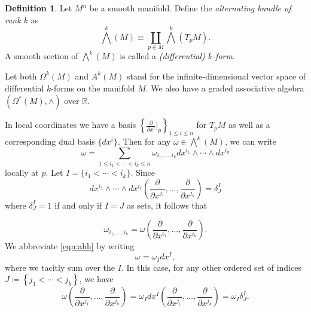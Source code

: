 \documentclass[10pt,letterpaper,cm]{nupset}
\theoremstyle{definition}
\newtheorem{definition}{Definition}[subsection]
\theoremstyle{theorem}
\theoremstyle{remark}
\newcommand{\R}{\mathbb R}
\newcommand{\1}{\mathbf{1}}
\newcommand{\0}{\vec 0}
\begin{document}
\begin{definition}
Let $M^n$ be a smooth manifold. Define the \textit{alternating bundle of rank $k$} as $$\bigwedge^k(M) \equiv \coprod_{p\in M} \bigwedge^k(T_pM).  $$ 
A smooth section of $\bigwedge^k(M)$ is called a \textit{(differential) $k$-form}.
\end{definition}

Let both $\Omega^k(M)$ and $A^k(M)$ stand for the infinite-dimensional vector space of differential $k$-forms on the manifold $M$. We also have a graded associative algebra $\left(\Omega^{\ast}(M), \wedge \right)$ over $\R$.  


\medskip

In local coordinates we have a basis $\left\{\frac{\partial}{\partial{x^i}}\bigr\rvert_p\right\}_{1\leq i \leq n}$ for $T_pM$ as well as a corresponding dual basis $\{dx^i\}$. Then for any $\omega \in \bigwedge^k(M)$, we can write 
\[ \label{eqn:ahh}
 \omega = \sum_{1\leq i_1 < \cdots < i_k \leq n}\omega_{i_1, \ldots, i_k} dx^{i_1} \wedge \cdots \wedge dx^{i_k} 
 \tag{1}
 \] locally at $p$. Let $I =  \{i_1 < \cdots < i_k\}$. Since $$dx^{i_1} \wedge \cdots \wedge dx^{i_{\ell}}\left( \frac{\partial}{\partial{x^{j_1}}}, \ldots, \frac{\partial}{\partial{x^{j_k}}} \right) = \delta^I_J$$ where $\delta^I_J = 1$ if and only if $I = J$ as sets, it follows that

\[
\label{eqn:twoo}
\omega_{i_1, \ldots, i_k}  = \omega\left(\frac{\partial}{\partial{x^{i_1}}}, \ldots, \frac{\partial}{\partial{x^{i_k}}}\right).
\tag{2} \] We abbreviate \eqref{eqn:ahh} by writing $$\omega = \omega_I dx^I,$$ where we tacitly sum over the $I$. In this case, for any other ordered set of indices $J \coloneqq \left\{j_1< \cdots < j_k\right\}$, we have 
\[
\omega\left(\frac{\partial}{\partial x^{j_{1}}}, \dots, \frac{\partial}{\partial x^{j_{k}}}\right)=\omega_{I} d x^{I}\left(\frac{\partial}{\partial x^{j_{1}}}, \dots, \frac{\partial}{\partial x^{j_{k}}}\right) = \omega_I{\delta_J^I}.
\]
\end{document}
